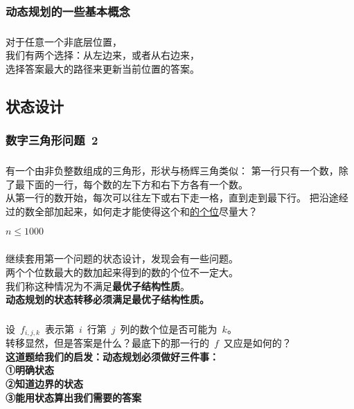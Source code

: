 \documentclass[UTF8]{beamer}
\begin{document}
	\subsubsection{动态规划的一些基本概念}
	\begin{frame}
		\frametitle{\insertsubsubsection}
		\Large {对于任意一个非底层位置， %
		\\
		\vspace{5mm}
		我们有两个选择：从左边来，或者从右边来， %
		\\
		\vspace{6mm}
		选择答案最大的路径来更新当前位置的答案。} %
	\end{frame}

	\subsection{状态设计}
	\subsubsection{数字三角形问题~2}
	\begin{frame}
		\frametitle{\insertsubsubsection}
		有一个由非负整数组成的三角形，形状与杨辉三角类似：
		第一行只有一个数，除了最下面的一行，每个数的左下方和右下方各有一个数。
		\\
		从第一行的数开始，每次可以往左下或右下走一格，直到走到最下行。
		把沿途经过的数全部加起来，如何走才能使得这个和\underline{的个位}尽量大？
		\\
		\begin{center}
			{\LARGE $n \le 1000$}
		\end{center}
	\end{frame}

	\begin{frame}
		\frametitle{\insertsubsubsection}
		继续套用第一个问题的状态设计，发现会有一些问题。
		\\\pause
		两个个位数最大的数加起来得到的数的个位不一定大。
		\\\pause
		我们称这种情况为不满足\textbf{最优子结构性质}。
		\\
		\textbf{动态规划的状态转移必须满足最优子结构性质。}
	\end{frame}

	\begin{frame}
		\frametitle{\insertsubsubsection}
		设~$f_{i, j, k}$~表示第~$i$~行第~$j$~列的数个位是否可能为~$k$。
		\\\pause
		转移显然，但是答案是什么？最底下的那一行的~$f$~又应是如何的？
		\\\pause
		\vspace{5mm}
		\textbf{这道题给我们的启发：动态规划必须做好三件事：
		\\
		\qquad ①明确状态
		\\
		\qquad ②知道边界的状态
		\\
		\qquad ③能用状态算出我们需要的答案}
	\end{frame}
\end{document}

